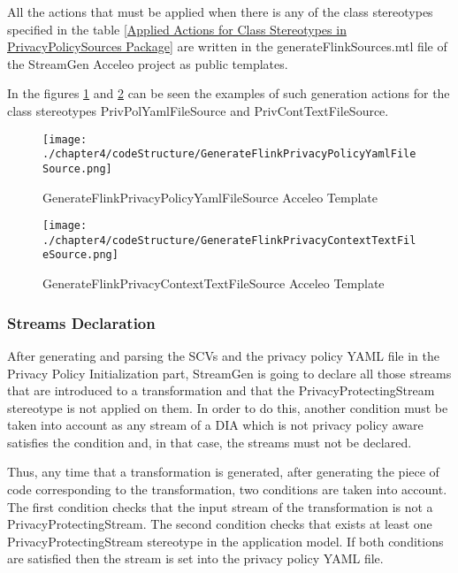 All the actions that must be applied when there is any of the class stereotypes specified in the table \ref{Applied Actions for Class Stereotypes in PrivacyPolicySources Package} are written in the generateFlinkSources.mtl file of the StreamGen Acceleo project as public templates.

In the figures \ref{fig:GenerateFlinkPrivacyPolicyYamlFileSource Acceleo Template} and \ref{fig:GenerateFlinkPrivacyContextTextFileSource Acceleo Template} can be seen the examples of such generation actions for the class stereotypes PrivPolYamlFileSource and PrivContTextFileSource.

\begin{figure}
\centering
{\texttt{[image: ./chapter4/codeStructure/GenerateFlinkPrivacyPolicyYamlFileSource.png]}}
\caption{GenerateFlinkPrivacyPolicyYamlFileSource Acceleo Template}
\label{fig:GenerateFlinkPrivacyPolicyYamlFileSource Acceleo Template}
\end{figure}

\begin{figure}
\centering
{\texttt{[image: ./chapter4/codeStructure/GenerateFlinkPrivacyContextTextFileSource.png]}}
\caption{GenerateFlinkPrivacyContextTextFileSource Acceleo Template}
\label{fig:GenerateFlinkPrivacyContextTextFileSource Acceleo Template}
\end{figure}

\subsubsection{Streams Declaration}

After generating and parsing the SCVs and the privacy policy YAML file in the Privacy Policy Initialization part, StreamGen is going to declare all those streams that are introduced to a transformation and that the PrivacyProtectingStream stereotype is not applied on them. In order to do this, another condition must be taken into account as any stream of a DIA which is not privacy policy aware satisfies the condition and, in that case, the streams must not be declared.

Thus, any time that a transformation is generated, after generating the piece of code corresponding to the transformation, two conditions are taken into account. The first condition checks that the input stream of the transformation is not a PrivacyProtectingStream. The second condition checks that exists at least one PrivacyProtectingStream stereotype in the application model. If both conditions are satisfied then the stream is set into the privacy policy YAML file.






